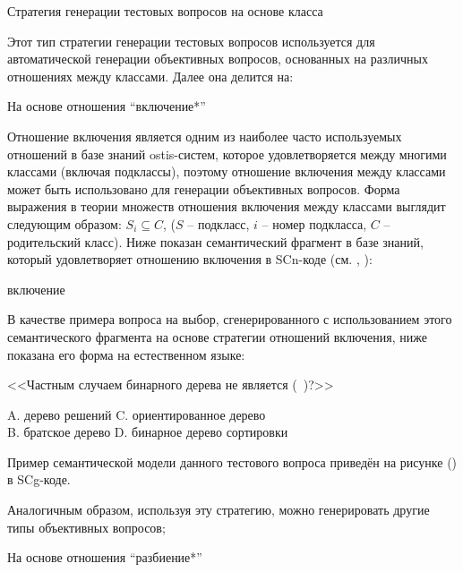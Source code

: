 \begin{textitemize}
	\item Стратегия генерации тестовых вопросов на основе класса
	
	Этот тип стратегии генерации тестовых вопросов используется для автоматической генерации объективных вопросов, основанных на различных отношениях между классами. Далее она делится на:
	
	\begin{textitemize}
		\item На основе отношения ``включение*''
		
		Отношение включения является одним из наиболее часто используемых отношений в базе знаний ostis-систем, которое удовлетворяется между многими классами (включая подклассы), поэтому отношение включения между классами может быть использовано для генерации объективных вопросов. Форма выражения в теории множеств отношения включения между классами выглядит следующим образом: $S_{i}\subseteq  C $, ($S$ – подкласс, $i$ – номер подкласса, $C$ – родительский класс). Ниже показан семантический фрагмент в базе знаний, который удовлетворяет отношению включения в SCn-коде (см. , ): 
		
		\begin{scnrelfromlist}{включение} 
		\end{scnrelfromlist}
		
		В качестве примера вопроса на выбор, сгенерированного с использованием этого семантического фрагмента на основе стратегии отношений включения, ниже показана его форма на естественном языке:
		
		<<Частным случаем бинарного дерева не является (\ )?>>
		
		A. дерево решений   \quad C. ориентированное дерево \\
		B. братское дерево  \quad D. бинарное дерево сортировки
		
		Пример семантической модели данного тестового вопроса приведён на рисунке (\textit{}) в SCg-коде.
		
		Аналогичным образом, используя эту стратегию, можно генерировать другие типы объективных вопросов;
		
		\item На основе отношения ``разбиение*''
		

\end{textitemize}
\end{textitemize}
